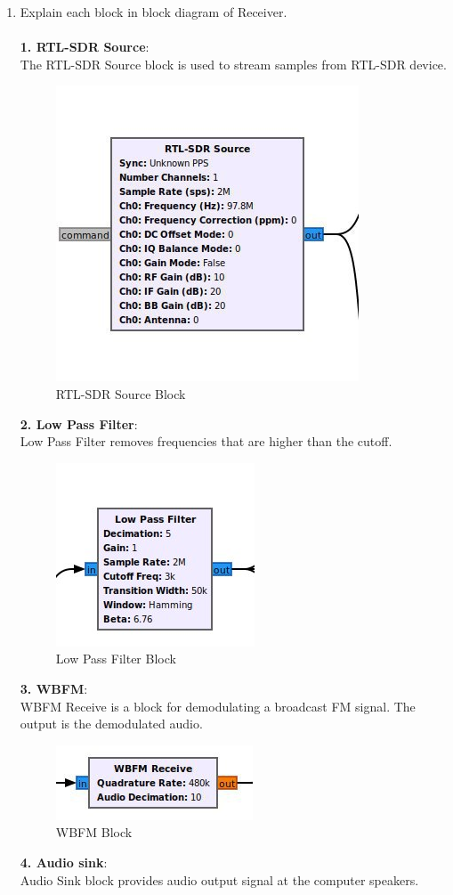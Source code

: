 \begin{enumerate}[label=\arabic*.,ref=\thesection.\theenumi]
\item Explain each block in block diagram of Receiver.\\
	\solution \\
\textbf{1. RTL-SDR Source}:\\
The RTL-SDR Source block is used to stream samples from RTL-SDR device.
\begin{figure}[H]
\centering
\includegraphics[width=0.4\columnwidth]{fm/rx/figs/source_block.png}
\caption{RTL-SDR Source Block}
\label{fig:source block}
\end{figure}
\textbf{2. Low Pass Filter}:\\
Low Pass Filter removes frequencies that are higher than the cutoff.
\begin{figure}[H]
\centering
\includegraphics[width=0.3\columnwidth]{fm/rx/figs/lpf_block.png}
\caption{Low Pass Filter Block}
\label{fig:rxlpf}
\end{figure}
\textbf{3. WBFM}:\\
WBFM Receive is a block for demodulating a broadcast FM signal. The output is the demodulated audio.
\begin{figure}[H]
\centering
\includegraphics[width=0.3\columnwidth]{fm/rx/figs/wbfm_block.png}
\caption{WBFM Block}
\label{fig:wbfmblock}
\end{figure}
\textbf{4. Audio sink}:\\
Audio Sink block provides audio output signal at the computer speakers.

\end{enumerate}
